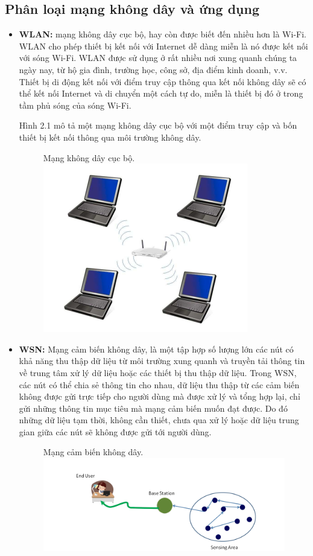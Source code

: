 \documentclass{uetgraduation}
\begin{document}
\subsection{Phân loại mạng không dây và ứng dụng}
\begin{itemize}
    \item \textbf{WLAN:} mạng không dây cục bộ, hay còn được biết đến nhiều hơn là Wi-Fi. WLAN cho phép thiết bị kết nối với Internet dễ dàng miễn là nó được kết nối với
    sóng Wi-Fi. WLAN được sử dụng ở rất nhiều nơi xung quanh chúng ta ngày nay, từ hộ gia đình, trường học, công sở, địa điểm kinh doanh, v.v. Thiết bị di động
    kết nối với điểm truy cập thông qua kết nối không dây sẽ có thể kết nối Internet và di chuyển một cách tự do, miễn là thiết bị đó ở trong tầm phủ sóng của
    sóng Wi-Fi.

    Hình 2.1 mô tả một mạng không dây cục bộ với một điểm truy cập và bốn thiết bị kết nối thông qua môi trường không dây.
    \begin{figure}{Mạng không dây cục bộ.}
        \centering
        \includegraphics[scale=0.6]{wlan}
        \label{fig:wlan}
    \end{figure}
    \item \textbf{WSN:} Mạng cảm biến không dây, là một tập hợp số lượng lớn các nút có khả năng thu thập dữ liệu từ môi trường xung quanh và truyền tải thông tin
    về trung tâm xử lý dữ liệu hoặc các thiết bị thu thập dữ liệu. Trong WSN, các nút có thể chia sẻ thông tin cho nhau, dữ liệu thu thập từ các cảm biến không được
    gửi trực tiếp cho người dùng mà được xử lý và tổng hợp lại, chỉ gửi những thông tin mục tiêu mà mạng cảm biến muốn đạt được. Do đó những dữ liệu tạm thời, không
    cần thiết, chưa qua xử lý hoặc dữ liệu trung gian giữa các nút sẽ không được gửi tới người dùng.
    \begin{figure}{Mạng cảm biến không dây.}
        \centering
        \includegraphics[scale=0.6]{wsn}
        \label{fig:wsn}
    \end{figure}


\end{itemize}
\end{document}
